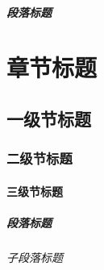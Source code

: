 \documentclass{QHUthesis}
\begin{document}
\paragraph{段落标题}

\chapter{章节标题}
\zhlipsum[1]
\section{一级节标题}
\zhlipsum[1]
\subsection{二级节标题}
\zhlipsum[1]
\subsubsection{三级节标题}
\zhlipsum[1]
\paragraph{段落标题}
\zhlipsum[1]
\subparagraph{子段落标题}
\zhlipsum[1]



\backmatter
 


\Thanks
\zhlipsum[1]
\Appendix
\zhlipsum[1]
\end{document}

